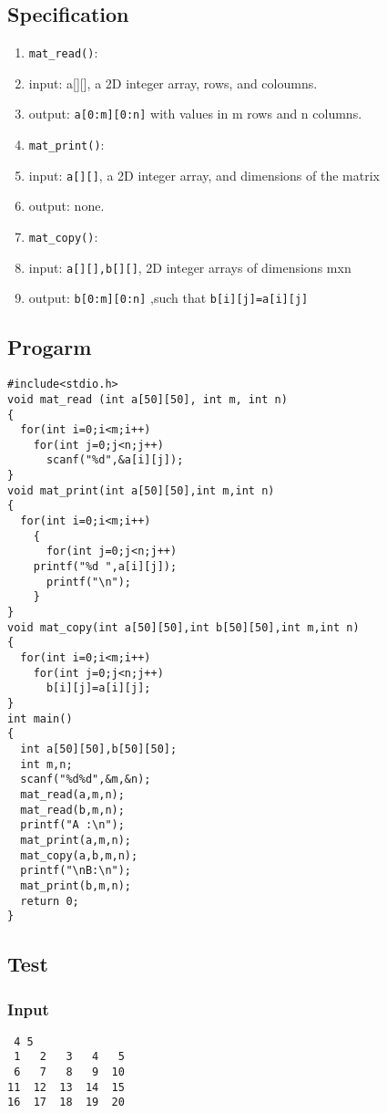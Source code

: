 \documentclass[11pt]{article}
\begin{document}
\subsection*{Specification}
\label{sec-5-2}
\begin{enumerate}
\item \texttt{mat\_read()}:
\item input: a[][], a 2D integer array, rows, and coloumns.
\item output: \texttt{a[0:m][0:n]} with values in m rows and n columns.
\item \texttt{mat\_print()}:
\item input: \texttt{a[][]}, a 2D integer array, and dimensions of the matrix
\item output: none.
\item \texttt{mat\_copy()}:
\item input: \texttt{a[][],b[][]}, 2D integer arrays of dimensions mxn
\item output: \texttt{b[0:m][0:n]} ,such that \texttt{b[i][j]=a[i][j]}
\end{enumerate}
\subsection*{Progarm}
\label{sec-5-3}
\begin{verbatim}
#include<stdio.h>
void mat_read (int a[50][50], int m, int n)
{
  for(int i=0;i<m;i++)
    for(int j=0;j<n;j++)
      scanf("%d",&a[i][j]);
}
void mat_print(int a[50][50],int m,int n)
{
  for(int i=0;i<m;i++)
    {
      for(int j=0;j<n;j++)
	printf("%d ",a[i][j]);
      printf("\n");
    }
}
void mat_copy(int a[50][50],int b[50][50],int m,int n)
{
  for(int i=0;i<m;i++)
    for(int j=0;j<n;j++)
      b[i][j]=a[i][j];
}
int main()
{
  int a[50][50],b[50][50];
  int m,n;
  scanf("%d%d",&m,&n);
  mat_read(a,m,n);
  mat_read(b,m,n);
  printf("A :\n");
  mat_print(a,m,n);
  mat_copy(a,b,m,n);
  printf("\nB:\n");
  mat_print(b,m,n);
  return 0;
}
\end{verbatim}
\subsection*{Test}
\label{sec-5-4}
\subsubsection*{Input}
\label{sec-5-4-1}
\begin{verbatim}
 4 5
 1   2   3   4   5 
 6   7   8   9  10 
11  12  13  14  15 
16  17  18  19  20
\end{verbatim}
\end{document}
